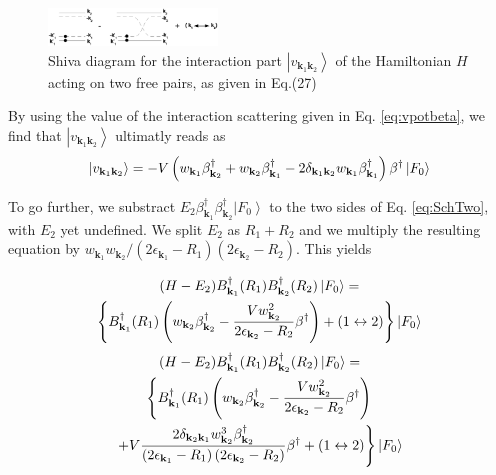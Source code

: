 \documentclass[aps,prb,superscriptaddress,twocolumn]{revtex4}
\begin{document}
\begin{figure}[htb]
   \includegraphics[width=0.4\textwidth]{twoPair.eps}
\caption{Shiva diagram for the interaction part $\left|v_{\mathbf{k} _1\mathbf{k} _2}\right>$ of the Hamiltonian $H$ acting on two free pairs, as given in Eq.(27)}
\label{fig:twoP}
\end{figure}

By using the value of the interaction scattering given in Eq.%
\eqref{eq:vpotbeta}, we find that $\left|v_{\mathbf{k} _1\mathbf{k}
_2}\right> $ ultimatly reads as
\begin{equation}
\left|v_{\mathbf{k} _1\mathbf{k} _2}\right> =-V\left(w_{\mathbf{k}
_1}\beta^{\dagger}_{\mathbf{k} _2}+w_{\mathbf{k} _2}\beta^{\dagger}_{\mathbf{%
k} _1}-2\delta_{\mathbf{k} _1\mathbf{k} _2}w_{\mathbf{k} _1}\beta^{\dagger}_{%
\mathbf{k} _1}\right) \beta^{\dagger}\left|F_0\right>  
\end{equation}

To go further, we substract $E _2\beta^{\dagger}_{\mathbf{k}
_1}\beta^{\dagger}_{\mathbf{k} _2}\left|F_0\right>  $ to the two sides of Eq.%
\eqref{eq:SchTwo}, with $E _2$ yet undefined. We split $E _2$ as $R_1+R_2$ and we multiply
the resulting equation by $w_{\mathbf{k} _1}w_{\mathbf{k} _2}/\left(2%
\epsilon_{\mathbf{k} _1}-R_1\right) \left(2\epsilon_{\mathbf{k}
_2}-R_2\right) $. This yields

\begin{multline}  \label{eq:SchTwo2}
(H-E _2)B^{\dagger}_{\mathbf{k} _1}(R_1)B^{\dagger}_{\mathbf{k}
_2}(R_2)\left|F_0\right>   = \\
\left\{B^{\dagger}_{\mathbf{k} _1}(R_1)\left(w_{\mathbf{k}
_2}\beta^{\dagger}_{\mathbf{k} _2}-\frac{Vw_{\mathbf{k} _2}^2}{2\epsilon_{%
\mathbf{k} _2}-R_2}\beta^{\dagger}\right)  +(1\leftrightarrow2)\right\}
\left|F_0\right>  
\end{multline}
\begin{multline*} %
(H-E _2)B^{\dagger}_{\mathbf{k} _1}(R_1)B^{\dagger}_{\mathbf{k}
_2}(R_2)\left|F_0\right>   = \\
\left\{B^{\dagger}_{\mathbf{k} _1}(R_1)\left(w_{\mathbf{k}
_2}\beta^{\dagger}_{\mathbf{k} _2}-\frac{Vw_{\mathbf{k} _2}^2}{2\epsilon_{%
\mathbf{k} _2}-R_2}\beta^{\dagger}\right)\right.\\
\left.+V\frac{2\delta_{{\mathbf{k} _2}{\mathbf{k} _1}}w^3_{{\mathbf{k} _2}}\beta^\dagger_{{\mathbf{k} _2}}}{\left(2%
\epsilon_{\mathbf{k} _1}-R_1\right) \left(2\epsilon_{\mathbf{k}
_2}-R_2\right)}\beta^\dagger  +(1\leftrightarrow2)\right\}
\left|F_0\right>  
\end{multline*}
\end{document}
